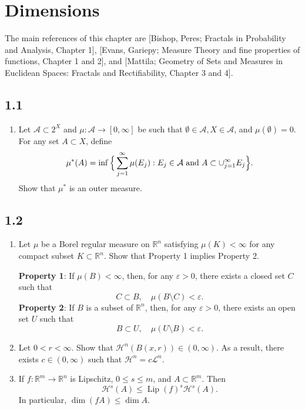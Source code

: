 
\section{Dimensions}
The main references of this chapter are [Bishop, Peres; Fractals in Probability and Analysis, Chapter 1], 
[Evans, Gariepy; Measure Theory and fine properties of functions, Chapter 1 and 2], 
and [Mattila; Geometry of Sets and Measures in Euclidean Spaces: Fractals and Rectifiability, Chapter 3 and 4].
\subsection*{1.1}
\begin{enumerate}
    \item Let $\mathcal{A}\subset 2^{X}$ and $\mu:\mathcal{A}\rightarrow [0,\infty]$ be such that $\emptyset \in \mathcal{A},X\in\mathcal A$, and $\mu(\emptyset)=0$. 
    For any set $A\subset X$, define
    \[ \mu^*(A)=\inf\Big\{\sum_{j=1}^{\infty}\mu(E_j):E_j\in \mathcal A \hspace{0.3em} \text{and} \hspace{0.3em}A\subset \cup_{j=1}^\infty E_j\Big\}.\]
    Show that $\mu^*$ is an outer measure.
\end{enumerate}

\subsection*{1.2}
\begin{enumerate}
    \item Let $\mu$ be a Borel regular measure on $\mathbb{R}^{n}$ 
    satisfying $\mu(K)<\infty$ for any compact subset $K \subset \mathbb{R}^{n}$. 
    Show that Property 1 implies Property 2.

    \textbf{Property 1}: If $\mu(B)<\infty$, then, for any $\varepsilon>0$, 
    there exists a closed set $C$ such that
    $$C \subset B, \quad \mu(B \setminus C)<\varepsilon.$$
    \textbf{Property 2}: If $B$ is a subset of $\mathbb{R}^{n}$, 
    then, for any $\varepsilon>0$, there exists an open set $U$ such that
    $$B \subset U, \quad \mu(U \setminus B)<\varepsilon.$$
    \item Let $0<r<\infty$. Show that $\mathcal{H}^{n}(B(x, r)) \in(0, \infty)$. 
    As a result, there exists $c \in(0, \infty)$ such that $\mathcal{H}^{n}=c \mathcal{L}^{n}$.
    \item If $f: \mathbb{R}^{m} \rightarrow \mathbb{R}^{n}$ is Lipschitz, $0 \leq s \leq m$, and $A \subset \mathbb{R}^{m}$. Then
    $$\mathcal{H}^{s}(A) \leq \operatorname{Lip}(f)^{s} \mathcal{H}^{s}(A).$$
    In particular, $\dim(f A) \leq \dim A.$
\end{enumerate}

